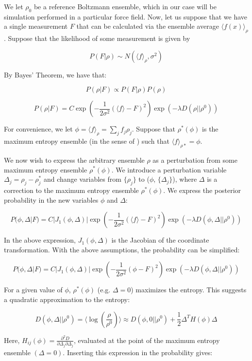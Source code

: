\documentclass[12pt]{article}
\begin{document}
We let $\rho_0$ be a reference Boltzmann ensemble, which in our case will be simulation performed in a particular force field. Now, let us suppose that we have a single measurement $F$ that can be calculated via the ensemble average $\langle f(x) \rangle_\rho$.  Suppose that the likelihood of some measurement is given by

$$P(F|\rho) \sim N(\langle f\rangle_\rho, \sigma^2)$$

By Bayes' Theorem, we have that:

$$P(\rho | F) \propto P(F | \rho) P(\rho)$$

$$P(\rho | F) = C \exp(-\frac{1}{2\sigma^2} (\langle f \rangle - F)^2) \exp(-\lambda D(\rho || \rho^0))$$

For convenience, we let $\phi = \langle f \rangle_\rho = \sum_j f_j \rho_j$.  Suppose that $\rho^*(\phi)$ is the maximum entropy ensemble (in the sense of \cite{chodera2012}) such that $\langle f \rangle_{\rho*} = \phi$.  

We now wish to express the arbitrary ensemble $\rho$ as a perturbation from some maximum entropy ensemble $\rho^*(\phi)$.  We introduce a perturbation variable $\Delta_j = \rho_j - \rho^*_j$ and change variables from $\{\rho_j\}$ to ($\phi$, $\{\Delta_j \}$), where $\Delta$ is a correction to the maximum entropy ensemble $\rho^*(\phi)$.  We express the posterior probability in the new variables $\phi$ and $\Delta$:

$$P(\phi, \Delta | F) = C |J_1(\phi, \Delta)| \exp(-\frac{1}{2\sigma^2} (\langle f \rangle - F)^2) \exp(-\lambda D(\phi, \Delta|| \rho^0)) $$

In the above expression, $J_1(\phi, \Delta)$ is the Jacobian of the coordinate transformation.  With the above assumptions, the probability can be simplified:

$$P(\phi, \Delta | F) = C |J_1(\phi, \Delta)| \exp(-\frac{1}{2\sigma^2} (\phi - F)^2) \exp(-\lambda D(\phi, \Delta|| \rho^0)) $$

For a given value of $\phi$, $\rho^*(\phi)$ (e.g. $\Delta = 0$) maximizes the entropy.  This suggests a quadratic approximation to the entropy:

$$D(\phi, \Delta|| \rho^0) = \langle \log(\frac{\rho}{\rho^0})\rangle \approx D(\phi, 0|| \rho^0) + \frac{1}{2} \Delta^T H(\phi) \Delta$$

Here, $H_{ij}(\phi) = \frac{\partial^2 D}{\partial \Delta_j \partial \Delta_j}$, evaluated at the point of the maximum entropy ensemble $(\Delta = 0)$.  Inserting this expression in the probability gives:
\end{document}

